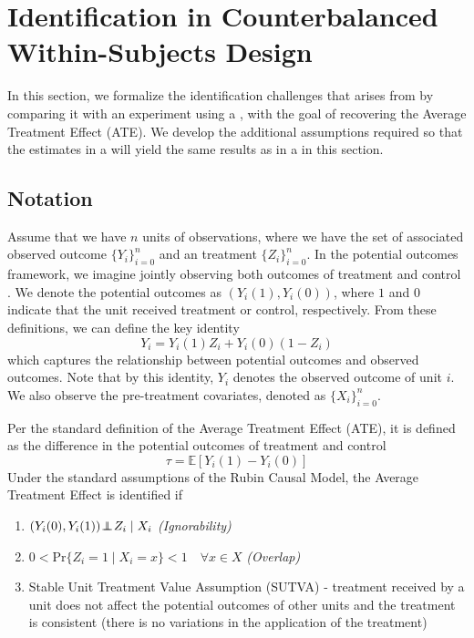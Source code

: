 
\section{Identification in Counterbalanced Within-Subjects Design}
\label{sec: identification_assumption}

In this section, we formalize the identification challenges that arises from \cwsd{} by comparing it with an experiment using a \bsd{}, with the goal of recovering the Average Treatment Effect (ATE). We develop the additional assumptions required so that the estimates in a \cwsd{} will yield the same results as in a \bsd{} in this section.

\subsection{Notation}

 Assume that we have $n$ units of observations, where we have the set of associated observed outcome $\{Y_i\}_{i=0}^n$ and an treatment $\{Z_i\}_{i=0}^n$. In the potential outcomes framework, we imagine jointly observing both outcomes of treatment and control \citep{10_holland1986statistics}. We denote the potential outcomes as $(Y_i(1), Y_i(0))$, where $1$ and $0$ indicate that the unit received treatment or control, respectively. From these definitions, we can define the key identity 
\begin{equation}
    Y_i = Y_i(1)Z_i + Y_i(0)(1 - Z_i)
\end{equation}
which captures the relationship between potential outcomes and observed outcomes. Note that by this identity, $Y_i$ denotes the observed outcome of unit $i$. We also observe the pre-treatment covariates, denoted as $\{X_i\}_{i=0}^n$.

Per the standard definition of the Average Treatment Effect (ATE), it is defined as the difference in the potential outcomes of treatment and control\[\tau = \mathbb{E}[Y_i(1) - Y_i(0)]\] 
Under the standard assumptions of the Rubin Causal Model, the Average Treatment Effect is identified if \citep{10_holland1986statistics}
\begin{enumerate}
    \item $(Y_i(0), Y_i(1)) \hspace{-.2em}\perp\!\!\!\!\perp\hspace{-.2em} Z_i \mid X_i$ \textit{(Ignorability)}
    \item $0 < \text{Pr}\{Z_i = 1 \mid X_i = x\} < 1 \quad \forall x \in X$ \textit{(Overlap)}
    \item Stable Unit Treatment Value Assumption (SUTVA) - treatment received by a unit does not affect the potential outcomes of other units and the treatment is consistent (there is no variations in the application of the treatment)
\end{enumerate}

